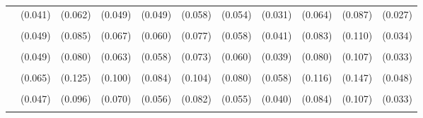 \documentclass[3p, authoryear, review]{elsarticle} %
\begin{document}
\begin{landscape}
\begin{table}
{\begin{tabular}[t]{lcccccccccc}
 & (0.041) & (0.062) & (0.049) & (0.049) & (0.058) & (0.054) & (0.031) & (0.064) & (0.087) & (0.027)\\
\cellcolor{gray!6}{Basketball} & \cellcolor{gray!6}{-0.170 ***} & \cellcolor{gray!6}{-0.255 **} & \cellcolor{gray!6}{-0.503 ***} & \cellcolor{gray!6}{-0.411 ***} & \cellcolor{gray!6}{-0.230 **} & \cellcolor{gray!6}{-0.193 ***} & \cellcolor{gray!6}{-0.390 ***} & \cellcolor{gray!6}{-0.445 ***} & \cellcolor{gray!6}{-0.359 **} & \cellcolor{gray!6}{-0.261 ***}\\
 & (0.049) & (0.085) & (0.067) & (0.060) & (0.077) & (0.058) & (0.041) & (0.083) & (0.110) & (0.034)\\
\cellcolor{gray!6}{Baseball} & \cellcolor{gray!6}{0.097 *} & \cellcolor{gray!6}{0.200 *} & \cellcolor{gray!6}{0.148 *} & \cellcolor{gray!6}{0.163 **} & \cellcolor{gray!6}{0.226 **} & \cellcolor{gray!6}{-0.023} & \cellcolor{gray!6}{0.187 ***} & \cellcolor{gray!6}{0.162 *} & \cellcolor{gray!6}{0.153} & \cellcolor{gray!6}{0.125 ***}\\
 & (0.049) & (0.080) & (0.063) & (0.058) & (0.073) & (0.060) & (0.039) & (0.080) & (0.107) & (0.033)\\
\cellcolor{gray!6}{Football / Soccer} & \cellcolor{gray!6}{-0.282 ***} & \cellcolor{gray!6}{-0.731 ***} & \cellcolor{gray!6}{-0.595 ***} & \cellcolor{gray!6}{-0.630 ***} & \cellcolor{gray!6}{-0.689 ***} & \cellcolor{gray!6}{-0.178 *} & \cellcolor{gray!6}{-0.588 ***} & \cellcolor{gray!6}{-0.357 **} & \cellcolor{gray!6}{-0.514 ***} & \cellcolor{gray!6}{-0.482 ***}\\
 & (0.065) & (0.125) & (0.100) & (0.084) & (0.104) & (0.080) & (0.058) & (0.116) & (0.147) & (0.048)\\
\cellcolor{gray!6}{Tennis} & \cellcolor{gray!6}{0.417 ***} & \cellcolor{gray!6}{-0.428 ***} & \cellcolor{gray!6}{-0.067} & \cellcolor{gray!6}{0.305 ***} & \cellcolor{gray!6}{-0.211 **} & \cellcolor{gray!6}{0.560 ***} & \cellcolor{gray!6}{0.120 **} & \cellcolor{gray!6}{0.162 +} & \cellcolor{gray!6}{0.131} & \cellcolor{gray!6}{0.213 ***}\\
 & (0.047) & (0.096) & (0.070) & (0.056) & (0.082) & (0.055) & (0.040) & (0.084) & (0.107) & (0.033)\\
\cellcolor{gray!6}{Volleyball} & \cellcolor{gray!6}{0.080} & \cellcolor{gray!6}{-0.222} & \cellcolor{gray!6}{0.122} & \cellcolor{gray!6}{0.244 *} & \cellcolor{gray!6}{-0.184} & \cellcolor{gray!6}{0.286 **} & \cellcolor{gray!6}{0.009} & \cellcolor{gray!6}{-0.116} & \cellcolor{gray!6}{0.121} & \cellcolor{gray!6}{0.163 *}\\

\end{tabular}}
\end{table}
\end{landscape}
\end{document}
